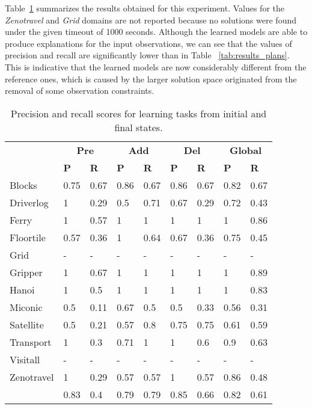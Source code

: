 \documentclass[runningheads]{llncs}
\begin{document}
Table~\ref{tab:results_min} summarizes the results obtained for this experiment. Values for the {\em Zenotravel} and {\em Grid} domains are not reported because no solutions were found under the given timeout of 1000 seconds. Although the learned models are able to produce explanations for the input observations, we can see that the values of precision and recall are significantly lower than in Table ~\ref{tab:results_plans}. This is indicative that the learned models are now considerably different from the reference ones, which is caused by the larger solution space originated from the removal of some observation constraints.

\begin{table}[h]
	\begin{center}
		\begin{tabular}{l|*{6}{p{1cm}|}|*{2}{p{1cm}|}}
			& \multicolumn{2}{c|}{\bf Pre} & \multicolumn{2}{c|}{\bf Add} & \multicolumn{2}{c||}{\bf Del} & \multicolumn{2}{c}{\bf Global}\\ \cline{2-9}			
			& {\bf P} & {\bf R} &{\bf P} & {\bf R} & {\bf P} & {\bf R} &  {\bf P} & {\bf R} \\
			\hline
			Blocks & 0.75 & 0.67 & 0.86 & 0.67 & 0.86 & 0.67 & 0.82 & 0.67 \\
			Driverlog & 1 & 0.29 & 0.5 & 0.71 & 0.67 & 0.29 & 0.72 & 0.43 \\
			Ferry & 1 & 0.57 & 1 & 1 & 1 & 1 & 1 & 0.86 \\
			Floortile & 0.57 & 0.36 & 1 & 0.64 & 0.67 & 0.36 & 0.75 & 0.45 \\
			Grid & - & - & - & - & - & - & - & - \\
			Gripper & 1 & 0.67 & 1 & 1 & 1 & 1 & 1 & 0.89 \\
			Hanoi & 1 & 0.5 & 1 & 1 & 1 & 1 & 1 & 0.83 \\
			Miconic & 0.5 & 0.11 & 0.67 & 0.5 & 0.5 & 0.33 & 0.56 & 0.31 \\
			Satellite & 0.5 & 0.21 & 0.57 & 0.8 & 0.75 & 0.75 & 0.61 & 0.59 \\
			Transport & 1 & 0.3 & 0.71 & 1 & 1 & 0.6 & 0.9 & 0.63 \\
			Visitall & - & - & - & - & - & - & - & - \\
			Zenotravel & 1 & 0.29 & 0.57 & 0.57 & 1 & 0.57 & 0.86 & 0.48 \\
			\hline
			& 0.83 & 0.4 & 0.79 & 0.79 & 0.85 & 0.66 & 0.82 & 0.61 \\			
		\end{tabular}
	\end{center}
	\caption{Precision and recall scores for learning tasks from initial and final states.}
	\label{tab:results_min}
\end{table}
\end{document}
